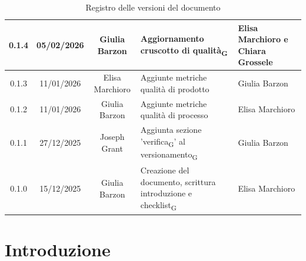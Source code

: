\documentclass[11pt,a4paper]{article}
\newcommand{\gls}[1]{#1\textsubscript{G}}
\begin{document}
\begin{table}[H]
\begin{tabular}{|c|c|c|>{\raggedright\arraybackslash}p{}|p{}|}
        \hline
        0.1.4 & 05/02/2026 & Giulia Barzon & Aggiornamento \gls{cruscotto di qualità} & Elisa Marchioro e Chiara Grossele\\
        \hline
        0.1.3 & 11/01/2026 & Elisa Marchioro & Aggiunte metriche qualità di prodotto & Giulia Barzon \\
        \hline
        0.1.2 & 11/01/2026 & Giulia Barzon & Aggiunte metriche qualità di processo & Elisa Marchioro\\
        \hline
        0.1.1 & 27/12/2025 & Joseph Grant & Aggiunta sezione '\gls{verifica}' al \gls{versionamento} & Giulia Barzon\\
        \hline
        0.1.0 & 15/12/2025 & Giulia Barzon & Creazione del documento, scrittura introduzione e \gls{checklist} & Elisa Marchioro\\
        \hline
    \end{tabular}
    \caption{Registro delle versioni del documento}
    \label{tab:versionamento}
\end{table}

\newpage

\tableofcontents
\thispagestyle{empty}
\newpage

\setcounter{page}{1}

\newcommand{\prossimoUT}{UT-\arabic{codiceUT}\stepcounter{codiceUT}}

\newcommand{\prossimoCT}{CT-\arabic{codiceCT}\stepcounter{codiceCT}}

\newcommand{\prossimoIT}{IT-\arabic{codiceIT}\stepcounter{codiceIT}}

\section{Introduzione}
\end{document}
